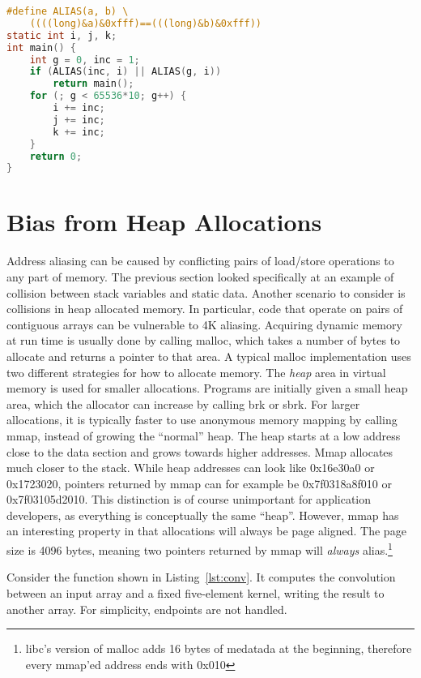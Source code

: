 \documentclass[a4paper,10pt,twocolumn,twoside]{article}
\begin{document}
\begin{lstlisting}[float=h, language=C, caption={Dynamically detect aliasing case, and avoid by pushing another stack frame.}, label={lst:loopkernel}, frame=lines]
#define ALIAS(a, b) \
    ((((long)&a)&0xfff)==(((long)&b)&0xfff))
static int i, j, k;
int main() {
    int g = 0, inc = 1;
    if (ALIAS(inc, i) || ALIAS(g, i))
        return main();
    for (; g < 65536*10; g++) {
        i += inc;
        j += inc;
        k += inc;
    }
    return 0;
}
\end{lstlisting}



\section{Bias from Heap Allocations}
Address aliasing can be caused by conflicting pairs of load/store operations to any part of memory.
The previous section looked specifically at an example of collision between stack variables and static data.
Another scenario to consider is collisions in heap allocated memory.
In particular, code that operate on pairs of contiguous arrays can be vulnerable to 4K aliasing.
Acquiring dynamic memory at run time is usually done by calling malloc, which takes a number of bytes to allocate and returns a pointer to that area.
A typical malloc implementation uses two different strategies for how to allocate memory.
The \emph{heap} area in virtual memory is used for smaller allocations.
Programs are initially given a small heap area, which the allocator can increase by calling brk or sbrk.
For larger allocations, it is typically faster to use anonymous memory mapping by calling mmap, instead of growing the ``normal'' heap.
The heap starts at a low address close to the data section and grows towards higher addresses. 
Mmap allocates much closer to the stack.
While heap addresses can look like 0x16e30a0 or 0x1723020, pointers returned by mmap can for example be 0x7f0318a8f010 or 0x7f03105d2010.
This distinction is of course unimportant for application developers, as everything is conceptually the same ``heap''.
However, mmap has an interesting property in that allocations will always be page aligned.
The page size is 4096 bytes, meaning two pointers returned by mmap will \emph{always} alias.\footnote{libc's version of malloc adds 16 bytes of medatada at the beginning, therefore every mmap'ed address ends with 0x010}

Consider the function shown in Listing~\ref{lst:conv}.
It computes the convolution between an input array and a fixed five-element kernel, writing the result to another array.
For simplicity, endpoints are not handled.
\end{document}
